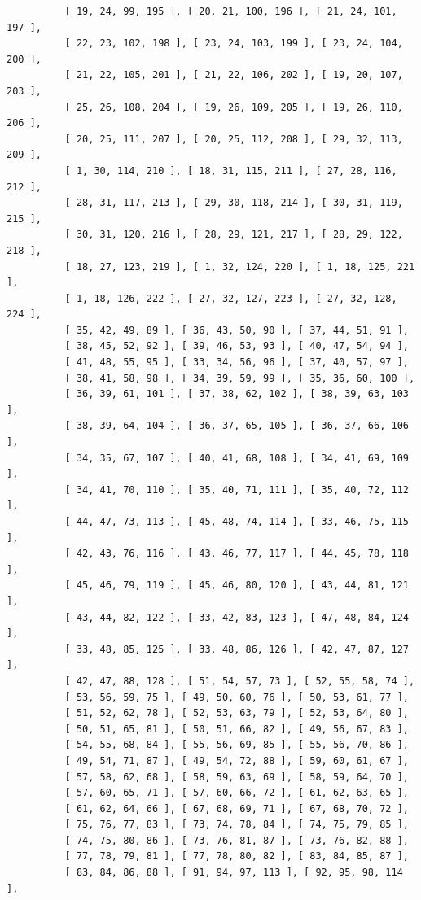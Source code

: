 \documentclass{article}
\begin{document}
\begin{verbatim}
          [ 19, 24, 99, 195 ], [ 20, 21, 100, 196 ], [ 21, 24, 101, 197 ], 
          [ 22, 23, 102, 198 ], [ 23, 24, 103, 199 ], [ 23, 24, 104, 200 ], 
          [ 21, 22, 105, 201 ], [ 21, 22, 106, 202 ], [ 19, 20, 107, 203 ], 
          [ 25, 26, 108, 204 ], [ 19, 26, 109, 205 ], [ 19, 26, 110, 206 ], 
          [ 20, 25, 111, 207 ], [ 20, 25, 112, 208 ], [ 29, 32, 113, 209 ], 
          [ 1, 30, 114, 210 ], [ 18, 31, 115, 211 ], [ 27, 28, 116, 212 ], 
          [ 28, 31, 117, 213 ], [ 29, 30, 118, 214 ], [ 30, 31, 119, 215 ], 
          [ 30, 31, 120, 216 ], [ 28, 29, 121, 217 ], [ 28, 29, 122, 218 ], 
          [ 18, 27, 123, 219 ], [ 1, 32, 124, 220 ], [ 1, 18, 125, 221 ], 
          [ 1, 18, 126, 222 ], [ 27, 32, 127, 223 ], [ 27, 32, 128, 224 ], 
          [ 35, 42, 49, 89 ], [ 36, 43, 50, 90 ], [ 37, 44, 51, 91 ], 
          [ 38, 45, 52, 92 ], [ 39, 46, 53, 93 ], [ 40, 47, 54, 94 ], 
          [ 41, 48, 55, 95 ], [ 33, 34, 56, 96 ], [ 37, 40, 57, 97 ], 
          [ 38, 41, 58, 98 ], [ 34, 39, 59, 99 ], [ 35, 36, 60, 100 ], 
          [ 36, 39, 61, 101 ], [ 37, 38, 62, 102 ], [ 38, 39, 63, 103 ], 
          [ 38, 39, 64, 104 ], [ 36, 37, 65, 105 ], [ 36, 37, 66, 106 ], 
          [ 34, 35, 67, 107 ], [ 40, 41, 68, 108 ], [ 34, 41, 69, 109 ], 
          [ 34, 41, 70, 110 ], [ 35, 40, 71, 111 ], [ 35, 40, 72, 112 ], 
          [ 44, 47, 73, 113 ], [ 45, 48, 74, 114 ], [ 33, 46, 75, 115 ], 
          [ 42, 43, 76, 116 ], [ 43, 46, 77, 117 ], [ 44, 45, 78, 118 ], 
          [ 45, 46, 79, 119 ], [ 45, 46, 80, 120 ], [ 43, 44, 81, 121 ], 
          [ 43, 44, 82, 122 ], [ 33, 42, 83, 123 ], [ 47, 48, 84, 124 ], 
          [ 33, 48, 85, 125 ], [ 33, 48, 86, 126 ], [ 42, 47, 87, 127 ], 
          [ 42, 47, 88, 128 ], [ 51, 54, 57, 73 ], [ 52, 55, 58, 74 ], 
          [ 53, 56, 59, 75 ], [ 49, 50, 60, 76 ], [ 50, 53, 61, 77 ], 
          [ 51, 52, 62, 78 ], [ 52, 53, 63, 79 ], [ 52, 53, 64, 80 ], 
          [ 50, 51, 65, 81 ], [ 50, 51, 66, 82 ], [ 49, 56, 67, 83 ], 
          [ 54, 55, 68, 84 ], [ 55, 56, 69, 85 ], [ 55, 56, 70, 86 ], 
          [ 49, 54, 71, 87 ], [ 49, 54, 72, 88 ], [ 59, 60, 61, 67 ], 
          [ 57, 58, 62, 68 ], [ 58, 59, 63, 69 ], [ 58, 59, 64, 70 ], 
          [ 57, 60, 65, 71 ], [ 57, 60, 66, 72 ], [ 61, 62, 63, 65 ], 
          [ 61, 62, 64, 66 ], [ 67, 68, 69, 71 ], [ 67, 68, 70, 72 ], 
          [ 75, 76, 77, 83 ], [ 73, 74, 78, 84 ], [ 74, 75, 79, 85 ], 
          [ 74, 75, 80, 86 ], [ 73, 76, 81, 87 ], [ 73, 76, 82, 88 ], 
          [ 77, 78, 79, 81 ], [ 77, 78, 80, 82 ], [ 83, 84, 85, 87 ], 
          [ 83, 84, 86, 88 ], [ 91, 94, 97, 113 ], [ 92, 95, 98, 114 ], 

\end{verbatim}
\end{document}
